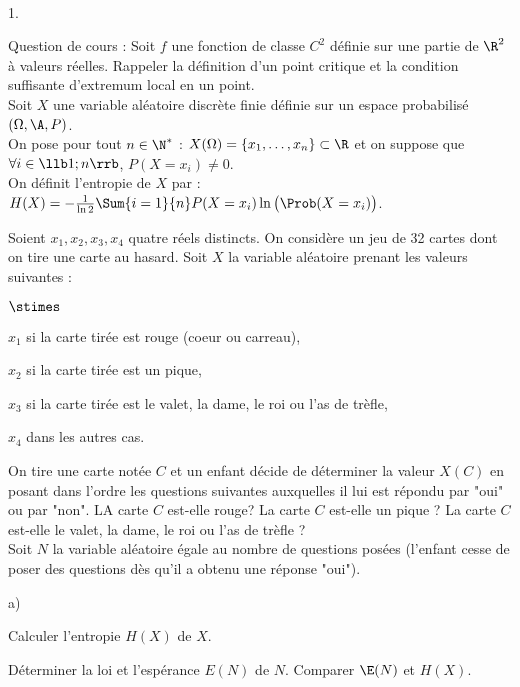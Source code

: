 \documentclass[11pt]{article}%
\begin{document}
\newpage


\begin{exerciceAP}~
  \begin{noliste}{1.}
    \setlength{\itemsep}{2mm}
  \item Question de cours : Soit $f$ une fonction de classe $C^2$
    définie sur une partie de $\R^2$ à valeurs réelles. Rappeler la
    définition d'un point critique et la condition suffisante
    d'extremum local en un point.\\

    Soit $X$ une variable aléatoire discrète finie définie sur un
    espace probabilisé $(\Omega , \A , P)$.\\
    On pose pour tout $n \in \N^*$ : $X ( \Omega ) = \{ x_1 , \dots ,
    x_n \} \subset \R$ et on suppose que $\forall i \in \llb 1 ; n
    \rrb$, $P (X=x_i) \neq 0$.\\

    On définit l'entropie de $X$ par : $ H(X) = - \frac{ 1 }{ \ln 2 }
    \Sum{i=1}{n} P (X=x_i) \ln \big( \Prob(X=x_i) \big)$.

  \item Soient $x_1 , x_2 , x_3 , x_4$ quatre réels distincts. On
    considère un jeu de 32 cartes dont on tire une carte au
    hasard. Soit $X$ la variable aléatoire prenant les valeurs
    suivantes : 
    \begin{noliste}{$\stimes$}
    \item $x_1$ si la carte tirée est rouge (coeur ou carreau),
    \item $x_2$ si la carte tirée est un pique,
    \item $x_3$ si la carte tirée est le valet, la dame, le roi ou
      l'as de trèfle,
    \item $x_4$ dans les autres cas.
    \end{noliste}

    On tire une carte notée $C$ et un enfant décide de déterminer la
    valeur $X(C)$ en posant dans l'ordre les questions suivantes
    auxquelles il lui est répondu par "oui" ou par "non". LA carte $C$
    est-elle rouge? La carte $C$ est-elle un pique ? La carte $C$
    est-elle le valet, la dame, le roi ou l'as de trèfle ? \\
    Soit $N$ la variable aléatoire égale au nombre de questions posées
    (l'enfant cesse de poser des questions dès qu'il a obtenu une
    réponse "oui"). 

    \begin{noliste}{a)}
    \setlength{\itemsep}{2mm}
    \item Calculer l'entropie $H(X)$ de $X$.
    \item Déterminer la loi et l'espérance $E (N)$ de $N$. Comparer
      $\E(N)$ et $H(X)$.
    \end{noliste}


\end{noliste}
\end{exerciceAP}
\end{document}
